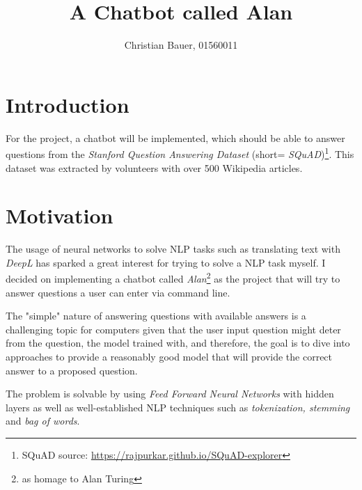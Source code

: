 
\title{A Chatbot called Alan}
\author{Christian Bauer, 01560011}
\date{}

% 
% 




\maketitle



\section{Introduction}
\label{sec:introduction}
    For the project, a chatbot will be implemented, which should be able to answer questions from the \emph{Stanford Question Answering Dataset} (short= \emph{SQuAD})\footnote{SQuAD source: \url{https://rajpurkar.github.io/SQuAD-explorer}}.
    This dataset was extracted by volunteers with over 500 Wikipedia articles. 
    

\section{Motivation}
\label{sec:motivation}
    The usage of neural networks to solve NLP tasks such as translating text with \emph{DeepL} has sparked a great interest for trying to solve a NLP task myself.
    I decided on implementing a chatbot called \emph{Alan}\footnote{as homage to Alan Turing} as the project that will try to answer questions a user can enter via command line.

    The "simple" nature of answering questions with available answers is a challenging topic for computers given that the user input question might deter from the question, the model trained with, and therefore, the goal is to dive into approaches to provide a reasonably good model that will provide the correct answer to a proposed question.

    The problem is solvable by using \emph{Feed Forward Neural Networks} with hidden layers as well as well-established NLP techniques such as \emph{tokenization, stemming} and \emph{bag of words}. 


